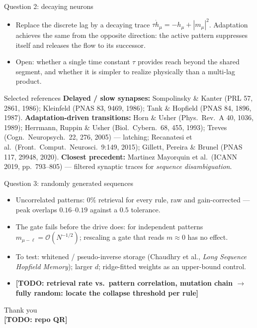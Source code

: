 \documentclass[aspectratio=169]{beamer}
\newcommand{\mvar}{m}
\newcommand{\TODO}[1]{{\color{red}\textbf{[TODO: #1]}}}
\begin{document}
\begin{frame}{Question 2: decaying neurons}
  \begin{itemize}
    \item Replace the discrete lag by a decaying trace
      $\tau \dot h_\mu = -h_\mu + |\mvar_\mu|^2$. Adaptation achieves the same
      from the opposite direction: the active pattern suppresses itself and
      releases the flow to its successor.
    \item Open: whether a single time constant $\tau$ provides reach beyond
      the shared segment, and whether it is simpler to realize physically
      than a multi-lag product.
  \end{itemize}
  \begin{block}{Selected references}
    \footnotesize
    \textbf{Delayed / slow synapses:} Sompolinsky \& Kanter (PRL 57, 2861,
    1986); Kleinfeld (PNAS 83, 9469, 1986); Tank \& Hopfield (PNAS 84, 1896,
    1987).
    \textbf{Adaptation-driven transitions:} Horn \& Usher (Phys.\ Rev.\ A 40,
    1036, 1989); Herrmann, Ruppin \& Usher (Biol.\ Cybern.\ 68, 455, 1993);
    Treves (Cogn.\ Neuropsych.\ 22, 276, 2005) --- latching; Recanatesi et
    al.\ (Front.\ Comput.\ Neurosci.\ 9:149, 2015); Gillett, Pereira \&
    Brunel (PNAS 117, 29948, 2020).
    \textbf{Closest precedent:} Martinez Mayorquin et al.\ (ICANN 2019,
    pp.\ 793--805) --- filtered synaptic traces for \emph{sequence
    disambiguation}.
  \end{block}
\end{frame}

\begin{frame}{Question 3: randomly generated sequences}
  \begin{itemize}
    \item Uncorrelated patterns: $0\%$ retrieval for every rule, raw and
      gain-corrected --- peak overlaps $0.16$--$0.19$ against a $0.5$
      tolerance.
    \item The gate fails before the drive does: for independent patterns
      $\mvar_{\mu-\ell} = \mathcal{O}(N^{-1/2})$; rescaling a gate that reads
      $\mvar \approx 0$ has no effect.
    \item To test: whitened / pseudo-inverse storage (Chaudhry et al.,
      \emph{Long Sequence Hopfield Memory}); larger $d$; ridge-fitted
      weights as an upper-bound control.
    \item \TODO{retrieval rate vs.\ pattern correlation, mutation chain
      $\to$ fully random: locate the collapse threshold per rule}
  \end{itemize}
\end{frame}

\begin{frame}
  \centering
  \Large Thank you \\[2mm]
  \normalsize \TODO{ repo QR}
\end{frame}
\end{document}
